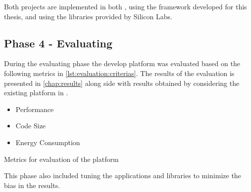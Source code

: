 Both projects are implemented in both {\rust}, using the framework developed for this thesis, and {\C} using the libraries provided by Silicon Labs.

\subsection{Phase 4 - Evaluating}
During the evaluating phase the develop platform was evaluated based on the following metrics in \autoref{lst:evaluation:criterias}.
The results of the evaluation is presented in \autoref{chap:results} along side with results obtained by considering the existing platform in {\C}.

\begin{listing}
  \begin{itemize}
  \item Performance
  \item Code Size
  \item Energy Consumption
  \end{itemize}
  \caption{Metrics for evaluation of the platform}
  \label{lst:evaluation:criterias}
\end{listing}
This phase also included tuning the applications and libraries to minimize the bias in the results.
